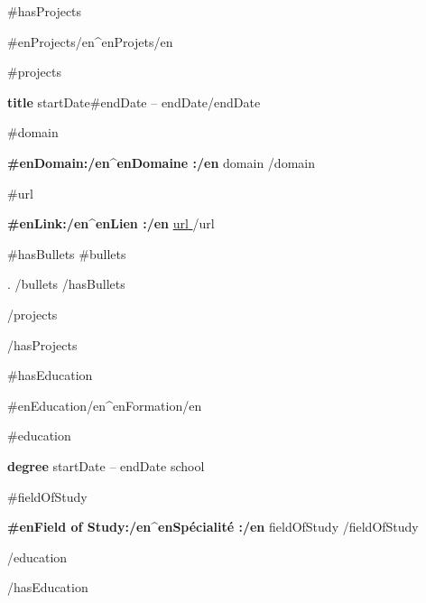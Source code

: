 \documentclass{resume}
\newcommand{\plainitem}[1]{\item{#1}}
\begin{document}

{{#hasProjects}}
\begin{rSection}{ {{#en}}Projects{{/en}}{{^en}}Projets{{/en}} }

{{#projects}}

\begin{rSubsectionNoBullet}{\bf {{{title}}}}{ {{{startDate}}}{{#endDate}} -- {{{endDate}}}{{/endDate}} }{}{}

    {{#domain}}
    \plainitem{\textbf{ {{#en}}Domain:{{/en}}{{^en}}Domaine :{{/en}} } {{{domain}}}}
    {{/domain}}

    {{#url}}
    \plainitem{\textbf{ {{#en}}Link:{{/en}}{{^en}}Lien :{{/en}} } \href{ {{{url}}} }{ {{{url}}} }}
    {{/url}}

    {{#hasBullets}}
        {{#bullets}}
        \plainitem{ {{{.}}} }
        {{/bullets}}
    {{/hasBullets}}

\end{rSubsectionNoBullet}

{{/projects}}

\end{rSection}
{{/hasProjects}}


{{#hasEducation}}
\begin{rSection}{ {{#en}}Education{{/en}}{{^en}}Formation{{/en}} }

{{#education}}

\begin{rSubsectionNoBullet}{\bf {{{degree}}}}{ {{{startDate}}} -- {{{endDate}}} }{ {{{school}}} }{}

    {{#fieldOfStudy}}
    \plainitem{\textbf{ {{#en}}Field of Study:{{/en}}{{^en}}Spécialité :{{/en}} } {{{fieldOfStudy}}}}
    {{/fieldOfStudy}}

\end{rSubsectionNoBullet}

{{/education}}

\end{rSection}
{{/hasEducation}}

\end{document}
